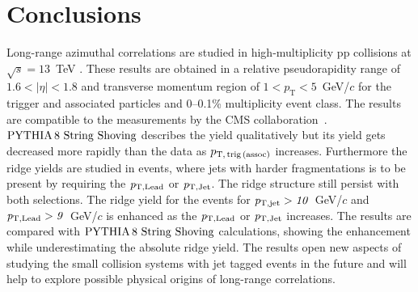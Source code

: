 
\section{Conclusions}
\label{sec:summary}
Long-range azimuthal correlations are studied in high-multiplicity pp collisions at $\sqrt{s} = 13$~TeV . These results are obtained in a relative pseudorapidity range of $1.6 < |\eta| < 1.8$ and transverse momentum region of $1 < p_{\mathrm T} < 5$~GeV/$c$ for the trigger and associated particles and 0--0.1\% multiplicity event class. 
The results are compatible to the measurements by the CMS collaboration~\cite{Khachatryan:2015lva}.
$\mathrm{PYTHIA}\,8~\mathrm{String}~\mathrm{Shoving}$ describes the yield qualitatively but its yield gets decreased more rapidly than the data as $p_\mathrm{T,\,trig\,(assoc)}$ increases.
Furthermore the ridge yields are studied in events, where jets with harder fragmentations is to be present by requiring the $\it{p}_{\rm{T,Lead}}$ or $\it{p}_{\rm{T,Jet}}$. The ridge structure still persist with both selections. The ridge yield for the events for $\it{p}_{\rm{T,jet}} > 10$~GeV/$c$ and $\it{p}_{\rm{T,Lead}} > 9$~GeV/$c$ is enhanced as the $\it{p}_{\rm{T,Lead}}$ or $\it{p}_{\rm{T,Jet}}$ increases. The results are compared with $\mathrm{PYTHIA}\,8~\mathrm{String}~\mathrm{Shoving}$ calculations, showing the enhancement while underestimating the absolute ridge yield.
The results open new aspects of studying the small collision systems with jet tagged events in the future and will help to explore possible physical origins of long-range correlations.